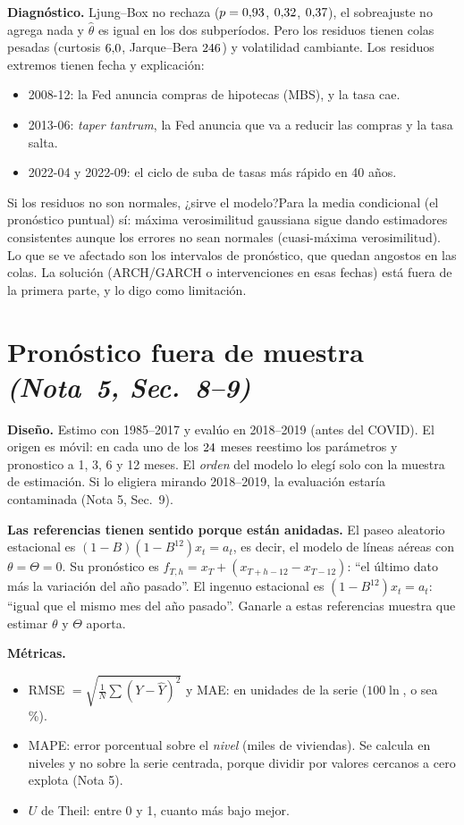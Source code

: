 \documentclass[11pt,a4paper]{article}
\newcommand{\nota}[2]{\textit{(Nota~#1, Sec.~#2)}}
\newcommand{\Q}[2]{\begin{pregunta}{#1}#2\end{pregunta}}
\begin{document}
\textbf{Diagn\'ostico.} Ljung--Box no rechaza ($p=0{,}93$, $0{,}32$, $0{,}37$), el sobreajuste no agrega nada y $\hat\theta$ es igual en los dos subper\'iodos. Pero los residuos tienen colas pesadas (curtosis $6{,}0$, Jarque--Bera $246$) y volatilidad cambiante. Los residuos extremos tienen fecha y explicaci\'on:
\begin{itemize}
\item 2008-12: la Fed anuncia compras de hipotecas (MBS), y la tasa cae.
\item 2013-06: \emph{taper tantrum}, la Fed anuncia que va a reducir las compras y la tasa salta.
\item 2022-04 y 2022-09: el ciclo de suba de tasas m\'as r\'apido en 40 a\~nos.
\end{itemize}

\Q{Si los residuos no son normales, ¿sirve el modelo?}{Para la media condicional (el pron\'ostico puntual) s\'i: m\'axima verosimilitud gaussiana sigue dando estimadores consistentes aunque los errores no sean normales (cuasi-m\'axima verosimilitud). Lo que se ve afectado son los intervalos de pron\'ostico, que quedan angostos en las colas. La soluci\'on (ARCH/GARCH o intervenciones en esas fechas) est\'a fuera de la primera parte, y lo digo como limitaci\'on.}

\section{Pron\'ostico fuera de muestra \nota{5}{8--9}}
\textbf{Dise\~no.} Estimo con 1985--2017 y eval\'uo en 2018--2019 (antes del COVID). El origen es m\'ovil: en cada uno de los $24$ meses reestimo los par\'ametros y pronostico a 1, 3, 6 y 12 meses. El \emph{orden} del modelo lo eleg\'i solo con la muestra de estimaci\'on. Si lo eligiera mirando 2018--2019, la evaluaci\'on estar\'ia contaminada (Nota 5, Sec.~9).

\textbf{Las referencias tienen sentido porque est\'an anidadas.} El paseo aleatorio estacional es $(1-B)(1-B^{12})x_t=a_t$, es decir, el modelo de l\'ineas a\'ereas con $\theta=\Theta=0$. Su pron\'ostico es $f_{T,h}=x_T+(x_{T+h-12}-x_{T-12})$: ``el \'ultimo dato m\'as la variaci\'on del a\~no pasado''. El ingenuo estacional es $(1-B^{12})x_t=a_t$: ``igual que el mismo mes del a\~no pasado''. Ganarle a estas referencias muestra que estimar $\theta$ y $\Theta$ aporta.

\textbf{M\'etricas.}
\begin{itemize}
\item RMSE $=\sqrt{\tfrac1N\sum(Y-\hat Y)^2}$ y MAE: en unidades de la serie ($100\ln$, o sea \%).
\item MAPE: error porcentual sobre el \emph{nivel} (miles de viviendas). Se calcula en niveles y no sobre la serie centrada, porque dividir por valores cercanos a cero explota (Nota 5).
\item $U$ de Theil: entre 0 y 1, cuanto m\'as bajo mejor.
\end{itemize}
\end{document}
